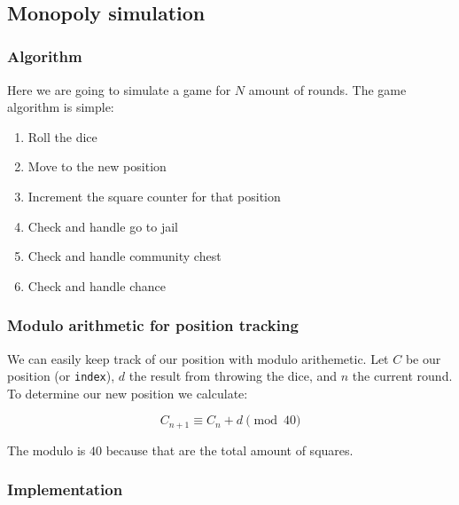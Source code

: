\documentclass[11pt]{article}
\providecommand{\tightlist}{%
      \setlength{\itemsep}{0pt}\setlength{\parskip}{0pt}}
\begin{document}
    \begin{center}
    \end{center}
    { \hspace*{\fill} \\}
    
    \hypertarget{monopoly-simulation}{%
\subsection{Monopoly simulation}\label{monopoly-simulation}}

    \hypertarget{algorithm}{%
\subsubsection{Algorithm}\label{algorithm}}

    Here we are going to simulate a game for \(N\) amount of rounds. The
game algorithm is simple:

\begin{enumerate}
\def\labelenumi{\arabic{enumi}.}
\tightlist
\item
  Roll the dice
\item
  Move to the new position
\item
  Increment the square counter for that position
\item
  Check and handle go to jail
\item
  Check and handle community chest
\item
  Check and handle chance
\end{enumerate}

    \hypertarget{modulo-arithmetic-for-position-tracking}{%
\subsubsection{Modulo arithmetic for position
tracking}\label{modulo-arithmetic-for-position-tracking}}

    We can easily keep track of our position with modulo arithemetic. Let
\(C\) be our position (or \texttt{index}), \(d\) the result from
throwing the dice, and \(n\) the current round. To determine our new
position we calculate:

\[ C_{n+1} \equiv C_n+d \pmod{40}\]

    The modulo is \(40\) because that are the total amount of squares.

    \hypertarget{implementation}{%
\subsubsection{Implementation}\label{implementation}}
\end{document}
